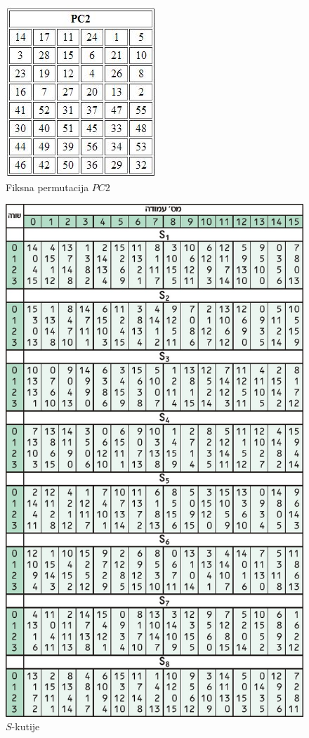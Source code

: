 \documentclass[a4paper,oneside,12pt]{memoir} %
\begin{document}
\begin{spacing}{1.5}
\begin{figure}[h]
\centering \includegraphics[scale=1]{PC2.jpg}
\caption{Fiksna permutacija $PC2$}
\label{fig:PC2}
\end{figure}

\begin{figure}[h]
\centering \includegraphics[scale=0.6]{S-box.jpg}
\caption{$S$-kutije}
\label{fig:sbox}
\end{figure}
 \newpage

\end{spacing}
\end{document}
